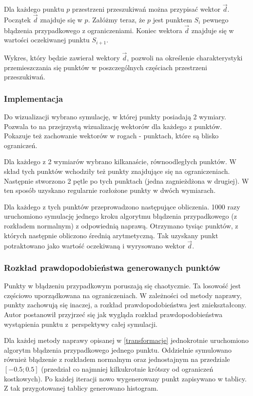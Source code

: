 \documentclass{mini}
\begin{document}
Dla każdego punktu $p$ przestrzeni przeszukiwań można przypisać wektor $\overrightarrow{d}$. Początek $\overrightarrow{d}$ znajduje się w $p$. Załóżmy teraz, że $p$ jest punktem $S_i$ pewnego błądzenia przypadkowego z ograniczeniami. Koniec wektora $\overrightarrow{d}$ znajduje się w wartości oczekiwanej punktu $S_{i+1}$.

Wykres, który będzie zawierał wektory $\overrightarrow{d}$, pozwoli na określenie charakterystyki przemieszczania się punktów w poszczególnych częściach przestrzeni przeszukiwań.

\subsubsection*{Implementacja}
Do wizualizacji wybrano symulację, w której punkty posiadają 2 wymiary. Pozwala to na przejrzystą wizualizację wektorów dla każdego z punktów. Pokazuje też zachowanie wektorów w rogach - punktach, które są blisko ograniczeń.

Dla każdego z 2 wymiarów wybrano kilkanaście, równoodległych punktów. W skład tych punktów wchodziły też punkty znajdujące się na ograniczeniach. Następnie stworzono 2 pętle po tych punktach (jedna zagnieżdżona w drugiej). W ten sposób uzyskano regularnie rozłożone punkty w dwóch wymiarach.

Dla każdego z tych punktów przeprowadzono następujące obliczenia. 1000 razy uruchomiono symulację jednego kroku algorytmu błądzenia przypadkowego (z rozkładem normalnym) z odpowiednią naprawą. Otrzymano tysiąc punktów, z których następnie obliczono średnią arytmetyczną. Tak uzyskany punkt potraktowano jako wartość oczekiwaną i wyrysowano wektor $\overrightarrow{d}$.

\subsubsection{Rozkład prawdopodobieństwa generowanych punktów}
Punkty w błądzeniu przypadkowym poruszają się chaotycznie. Ta losowość jest częściowo uporządkowana na ograniczeniach. W zależności od metody naprawy, punkty zachowują się inaczej, a rozkład prawdopodobieństwa jest zniekształcony. Autor postanowił przyjrzeć się jak wygląda rozkład prawdopodobieństwa wystąpienia punktu z~perspektywy całej symulacji.

Dla każdej metody naprawy opisanej w \ref{transformacje} jednokrotnie uruchomiono algorytm błądzenia przypadkowego jednego punktu. Oddzielnie symulowano również błądzenie z rozkładem normalnym oraz jednostajnym na przedziale $[-0.5; 0.5]$ (przedział co najmniej kilkukrotnie krótszy od ograniczeń kostkowych). Po każdej iteracji nowo wygenerowany punkt zapisywano w tablicy. Z tak przygotowanej tablicy generowano histogram.
\end{document}
